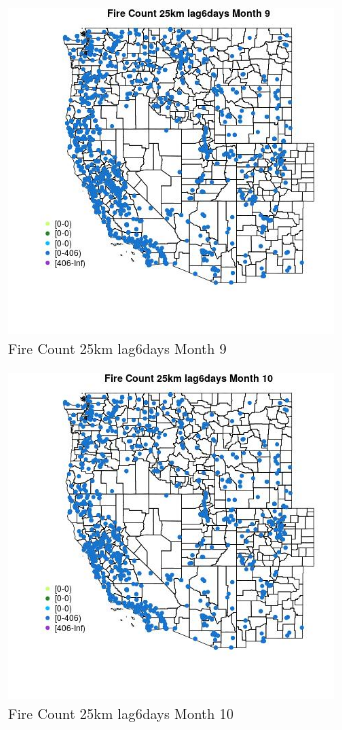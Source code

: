 \begin{figure} 
\centering  
\includegraphics[width=0.77\textwidth]{Code_Outputs/Report_ML_input_PM25_Step4_part_f_de_duplicated_aves_prioritize_24hr_obswNAs_MapObsMo9Fire_Count_25km_lag6days.jpg} 
\caption{\label{fig:Report_ML_input_PM25_Step4_part_f_de_duplicated_aves_prioritize_24hr_obswNAsMapObsMo9Fire_Count_25km_lag6days}Fire Count 25km lag6days Month 9} 
\end{figure} 
 

\clearpage 

\begin{figure} 
\centering  
\includegraphics[width=0.77\textwidth]{Code_Outputs/Report_ML_input_PM25_Step4_part_f_de_duplicated_aves_prioritize_24hr_obswNAs_MapObsMo10Fire_Count_25km_lag6days.jpg} 
\caption{\label{fig:Report_ML_input_PM25_Step4_part_f_de_duplicated_aves_prioritize_24hr_obswNAsMapObsMo10Fire_Count_25km_lag6days}Fire Count 25km lag6days Month 10} 
\end{figure} 
 

